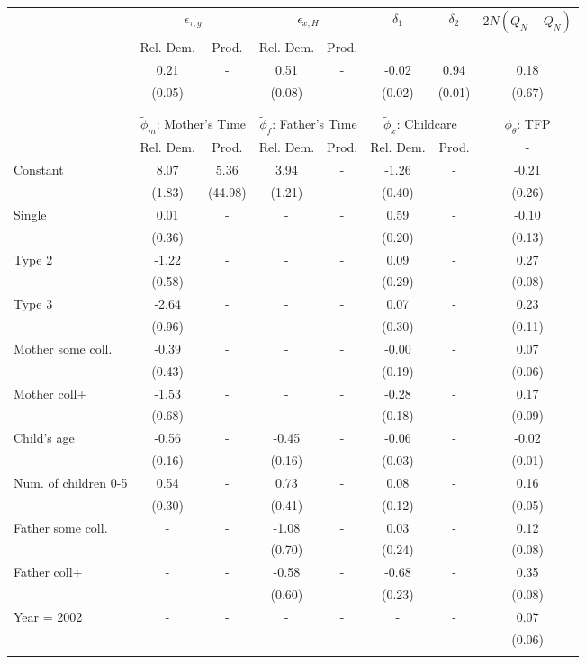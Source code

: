 \begin{tabular}{lccccccc}\toprule
 & \multicolumn{2}{c}{$\epsilon_{\tau,g}$} & \multicolumn{2}{c}{$\epsilon_{x,H}$} & {$\delta_{1}$} & {$\delta_{2}$} & $2N(Q_{N} - \tilde{Q}_{N})$ \\
 & Rel. Dem. & Prod. & Rel. Dem. & Prod. & - & - & - \\\cmidrule(r){2-3}\cmidrule(r){4-5}\cmidrule(r){6-6}\cmidrule(r){7-7}\cmidrule(r){8-8}
&0.21& - &0.51& - &-0.02&0.94&0.18\\
&(0.05)& - &(0.08)& - &(0.02)&(0.01)&(0.67)\\
\\
&&&&&&&\\
 & \multicolumn{2}{c}{$\tilde{\phi}_{m}$: Mother's Time} & \multicolumn{2}{c}{$\tilde{\phi}_{f}$: Father's Time} & \multicolumn{2}{c}{$\tilde{\phi}_{x}$: Childcare} &{$\phi_{\theta}$: TFP} \\
 & Rel. Dem. & Prod. & Rel. Dem. & Prod. & Rel. Dem. & Prod. & -  \\\cmidrule(r){2-3}\cmidrule(r){4-5}\cmidrule(r){6-7}\cmidrule(r){8-8}
Constant&8.07&5.36&3.94& -&-1.26& -&-0.21\\
&(1.83)&(44.98)&(1.21)&&(0.40)&&(0.26)\\
Single&0.01& -& - & -&0.59& -&-0.10\\
&(0.36)& & &&(0.20)&&(0.13)\\
Type 2&-1.22& -& - & -&0.09& -&0.27\\
&(0.58)& & &&(0.29)&&(0.08)\\
Type 3&-2.64& -& - & -&0.07& -&0.23\\
&(0.96)& & &&(0.30)&&(0.11)\\
Mother some coll.&-0.39& -& - & -&-0.00& -&0.07\\
&(0.43)& & &&(0.19)&&(0.06)\\
Mother coll+&-1.53& -& - & -&-0.28& -&0.17\\
&(0.68)& & &&(0.18)&&(0.09)\\
Child's age&-0.56& -&-0.45& -&-0.06& -&-0.02\\
&(0.16)&&(0.16)&&(0.03)&&(0.01)\\
Num. of children 0-5&0.54& -&0.73& -&0.08& -&0.16\\
&(0.30)&&(0.41)&&(0.12)&&(0.05)\\
Father some coll.& - & -&-1.08& -&0.03& -&0.12\\
 & &&(0.70)&&(0.24)&&(0.08)\\
Father coll+& - & -&-0.58& -&-0.68& -&0.35\\
 & &&(0.60)&&(0.23)&&(0.08)\\
Year = 2002& - & -& - & -& - & -&0.07\\
 & & & & & &&(0.06)\\
\\
\bottomrule\end{tabular}